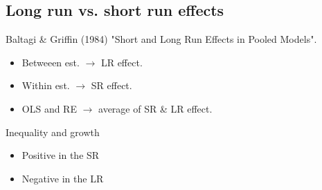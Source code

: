 \begin{multicols}{2}
 \subsection{Long run vs. short run effects} %
 Baltagi \& Griffin (1984) "Short and Long Run Effects in Pooled Models".
 \begin{itemize}
  \item Betweeen est. $\rightarrow$ LR effect.
  \item Within est. $\rightarrow$ SR effect.
  \item OLS and RE $\rightarrow$ average of SR \& LR effect.
 \end{itemize}
 Inequality and growth
 \begin{itemize}
  \item Positive in the SR
  \item Negative in the LR
 \end{itemize}


\end{multicols}


